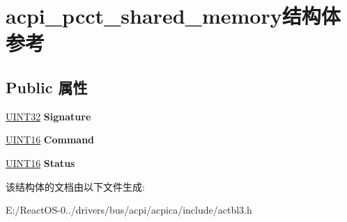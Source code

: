 \hypertarget{structacpi__pcct__shared__memory}{}\section{acpi\+\_\+pcct\+\_\+shared\+\_\+memory结构体 参考}
\label{structacpi__pcct__shared__memory}
\subsection*{Public 属性}
\begin{DoxyCompactItemize}
\item 
\mbox{\label{structacpi__pcct__shared__memory_a34427b71248d0a83b76cf86cd21a0951}} 
\hyperlink{_processor_bind_8h_ae1e6edbbc26d6fbc71a90190d0266018}{U\+I\+N\+T32} {\bfseries Signature}
\item 
\mbox{\label{structacpi__pcct__shared__memory_aff11349c8a527424dffc5fd12f122377}} 
\hyperlink{_processor_bind_8h_a09f1a1fb2293e33483cc8d44aefb1eb1}{U\+I\+N\+T16} {\bfseries Command}
\item 
\mbox{\label{structacpi__pcct__shared__memory_aa490d84de90d2ce0fd576374e5fb4044}} 
\hyperlink{_processor_bind_8h_a09f1a1fb2293e33483cc8d44aefb1eb1}{U\+I\+N\+T16} {\bfseries Status}
\end{DoxyCompactItemize}


该结构体的文档由以下文件生成\+:\begin{DoxyCompactItemize}
\item 
E\+:/\+React\+O\+S-\/0../drivers/bus/acpi/acpica/include/actbl3.\+h\end{DoxyCompactItemize}
